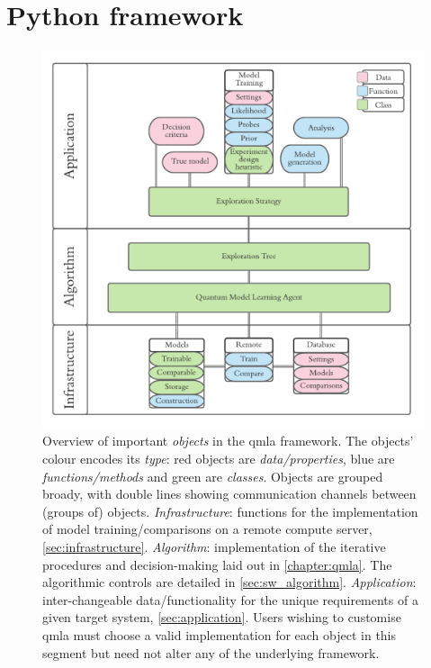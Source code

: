 \section{Python framework}
\begin{figure}
    \includegraphics{algorithms/figures/software_overview.pdf}
    \caption[QMLA codebase overview]{
        Overview of important \emph{objects} in the \gls{qmla} framework.
        The objects' colour encodes its \emph{type}: 
            red objects are \emph{data/properties},
            blue are \emph{functions/methods} 
            and green are \emph{classes}. 
        Objects are grouped broady, with double lines showing communication channels between (groups of) objects. 
        \emph{Infrastructure}: functions for the implementation of model training/comparisons on 
            a remote compute server, \cref{sec:infrastructure}.
        \emph{Algorithm}: implementation of the iterative procedures and decision-making 
        laid out in \cref{chapter:qmla}. The algorithmic controls are detailed in \cref{sec:sw_algorithm}. 
        \emph{Application}: inter-changeable data/functionality for the unique requirements 
        of a given target system, \cref{sec:application}. 
        Users wishing to customise \gls{qmla} must choose a valid implementation for each object in this segment
            but need not alter any of the underlying framework.
    }
    \label{fig:software_overview}
\end{figure}

